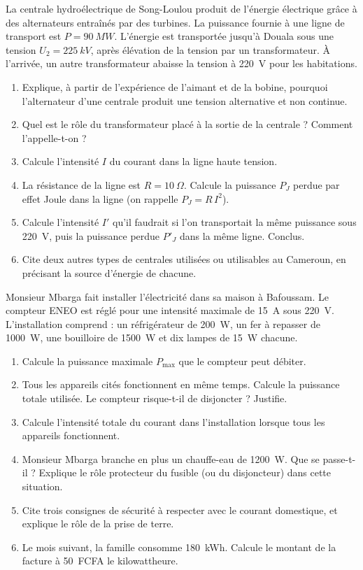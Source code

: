 \documentclass[11pt]{article}
\begin{document}
\begin{exercice}
La centrale hydroélectrique de Song-Loulou produit de l'énergie électrique grâce à des alternateurs entraînés par des turbines. La puissance fournie à une ligne de transport est $P = \SI{90}{MW}$. L'énergie est transportée jusqu'à Douala sous une tension $U_2 = \SI{225}{kV}$, après élévation de la tension par un transformateur. À l'arrivée, un autre transformateur abaisse la tension à \SI{220}{V} pour les habitations.
\begin{enumerate}
\item Explique, à partir de l'expérience de l'aimant et de la bobine, pourquoi l'alternateur d'une centrale produit une tension alternative et non continue.
\item Quel est le rôle du transformateur placé à la sortie de la centrale ? Comment l'appelle-t-on ?
\item Calcule l'intensité $I$ du courant dans la ligne haute tension.
\item La résistance de la ligne est $R = \SI{10}{\Omega}$. Calcule la puissance $P_J$ perdue par effet Joule dans la ligne (on rappelle $P_J = R\,I^2$).
\item Calcule l'intensité $I'$ qu'il faudrait si l'on transportait la même puissance sous \SI{220}{V}, puis la puissance perdue $P'_J$ dans la même ligne. Conclus.
\item Cite deux autres types de centrales utilisées ou utilisables au Cameroun, en précisant la source d'énergie de chacune.
\end{enumerate}
\end{exercice}

\begin{exercice}
Monsieur Mbarga fait installer l'électricité dans sa maison à Bafoussam. Le compteur ENEO est réglé pour une intensité maximale de \SI{15}{A} sous \SI{220}{V}. L'installation comprend : un réfrigérateur de \SI{200}{W}, un fer à repasser de \SI{1000}{W}, une bouilloire de \SI{1500}{W} et dix lampes de \SI{15}{W} chacune.
\begin{enumerate}
\item Calcule la puissance maximale $P_{\max}$ que le compteur peut débiter.
\item Tous les appareils cités fonctionnent en même temps. Calcule la puissance totale utilisée. Le compteur risque-t-il de disjoncter ? Justifie.
\item Calcule l'intensité totale du courant dans l'installation lorsque tous les appareils fonctionnent.
\item Monsieur Mbarga branche en plus un chauffe-eau de \SI{1200}{W}. Que se passe-t-il ? Explique le rôle protecteur du fusible (ou du disjoncteur) dans cette situation.
\item Cite trois consignes de sécurité à respecter avec le courant domestique, et explique le rôle de la prise de terre.
\item Le mois suivant, la famille consomme \SI{180}{kWh}. Calcule le montant de la facture à \SI{50}{FCFA} le kilowattheure.
\end{enumerate}
\end{exercice}
\end{document}
